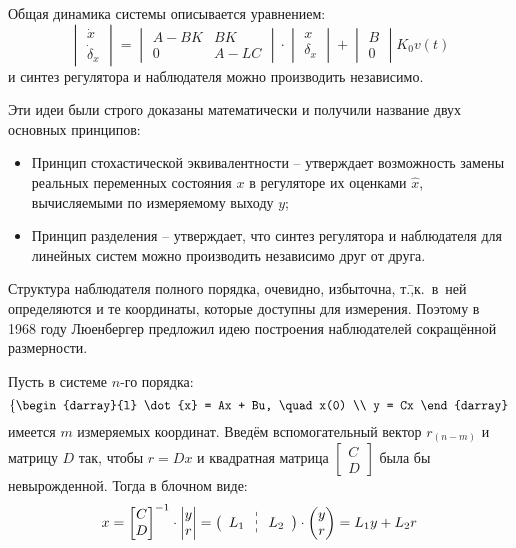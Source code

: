 \documentclass[preprint,russian,a5paper,10pt,twoside,mediummath]{ncc}
\newcommand{\columndelimiter}{ \enskip \raisebox{-1ex}{ \tikz \draw[dashed] (0,-2ex) -- (0,2ex); } \enskip }
\begin{document}
Общая динамика системы описывается уравнением:
\[ \begin{vmatrix}
	\dot{x} \\
	\dot{ \delta }_x
\end{vmatrix} = \begin{vmatrix}
	A - BK & BK \\
	0 & A - LC
\end{vmatrix} \cdot \begin{vmatrix}
	x \\
	\delta _x
\end{vmatrix} + \begin{vmatrix}
	B \\
	0
\end{vmatrix} K_0 v(t) \]
и синтез регулятора и наблюдателя можно производить независимо.

Эти идеи были строго доказаны математически и получили название двух основных принципов:
\begin{itemize}
\item Принцип стохастической эквивалентности \--- утверждает возможность замены реальных переменных состояния $ x $ в регуляторе их оценками $ \hat{x} $, вычисляемыми по измеряемому выходу $ y $;
\item Принцип разделения \--- утверждает, что синтез регулятора и наблюдателя для линейных систем можно производить независимо друг от друга.
\end{itemize}

Структура наблюдателя полного порядка, очевидно, избыточна, т.\=,к.~в~ней определяются и те координаты, которые доступны для измерения. Поэтому в 1968 году Люенбергер предложил идею построения наблюдателей сокращённой размерности.

Пусть в системе $n$-го порядка:
\[ \left\{ \begin{darray}{l}
	\dot{x} = Ax + Bu, \quad x(0) \\
	y = Cx
\end{darray} \right. \]
имеется $m$ измеряемых координат. Введём вспомогательный вектор $ r_{(n-m)} $ и матрицу $ D $ так, чтобы $ r = Dx $ и квадратная матрица $ \begin{bmatrix} C \\ D \end{bmatrix} $ была бы невырожденной. Тогда в блочном виде:
\[ x = { \begin{bmatrix} C \\ D \end{bmatrix} }^{-1} \cdot \begin{vmatrix} y \\ r \end{vmatrix} = \bigl( \enskip L_1 \columndelimiter L_2 \enskip \bigr) \cdot \begin{pmatrix} y \\ r \end{pmatrix} = L_1 y + L_2 r \]
\end{document}
